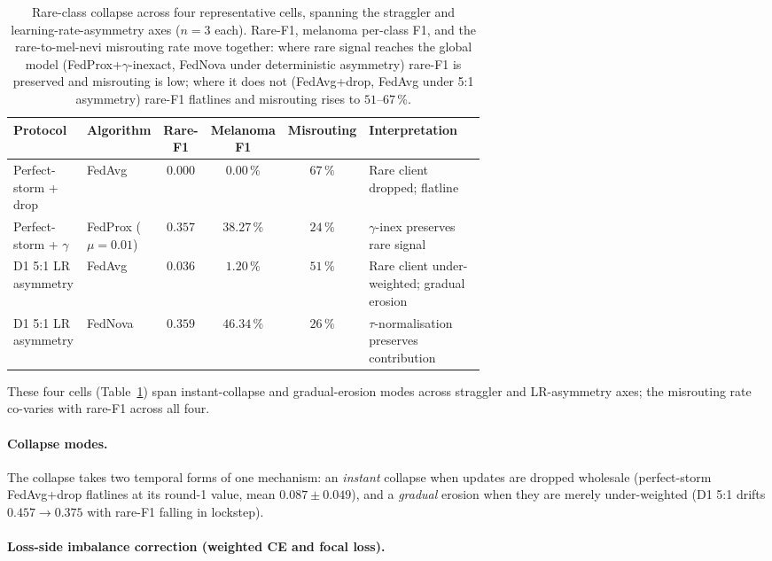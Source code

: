 \documentclass[11pt,a4paper]{report}
\begin{document}
\begin{table}[H]
\centering
\small
\caption{Rare-class collapse across four representative cells, spanning the
straggler and learning-rate-asymmetry axes ($n=3$ each). Rare-F1, melanoma
per-class F1, and the rare-to-mel-nevi misrouting rate move together: where
rare signal reaches the global model (FedProx+$\gamma$-inexact, FedNova under
deterministic asymmetry) rare-F1 is preserved and misrouting is low; where it
does not (FedAvg+drop, FedAvg under 5:1 asymmetry) rare-F1 flatlines and
misrouting rises to $51$--$67\,\%$.}
\label{tab:collapse-cells}
\begin{tabular}{p{0.16\linewidth} p{0.14\linewidth} c c c p{0.32\linewidth}}
\hline
Protocol                  & Algorithm & Rare-F1 & Melanoma F1 & Misrouting & Interpretation \\
\hline
Perfect-storm + drop      & FedAvg    & $0.000$ & $0.00\,\%$  & $67\,\%$   & Rare client dropped; flatline \\
Perfect-storm + $\gamma$  & FedProx ($\mu=0.01$) & $0.357$ & $38.27\,\%$ & $24\,\%$ & $\gamma$-inex preserves rare signal \\
D1 5:1 LR asymmetry       & FedAvg    & $0.036$ & $1.20\,\%$  & $51\,\%$   & Rare client under-weighted; gradual erosion \\
D1 5:1 LR asymmetry       & FedNova   & $0.359$ & $46.34\,\%$ & $26\,\%$   & $\tau$-normalisation preserves contribution \\
\hline
\end{tabular}
\end{table}

\noindent
These four cells (Table~\ref{tab:collapse-cells}) span instant-collapse and
gradual-erosion modes across straggler and LR-asymmetry axes; the misrouting
rate co-varies with rare-F1 across all four.


\paragraph{Collapse modes.}

The collapse takes two temporal forms of one mechanism: an \emph{instant}
collapse when updates are dropped wholesale (perfect-storm FedAvg+drop flatlines
at its round-1 value, mean $0.087 \pm 0.049$), and a \emph{gradual} erosion when
they are merely under-weighted (D1 5:1 drifts $0.457 \to 0.375$ with rare-F1
falling in lockstep).


\paragraph{Loss-side imbalance correction (weighted CE and focal loss).}
\end{document}
